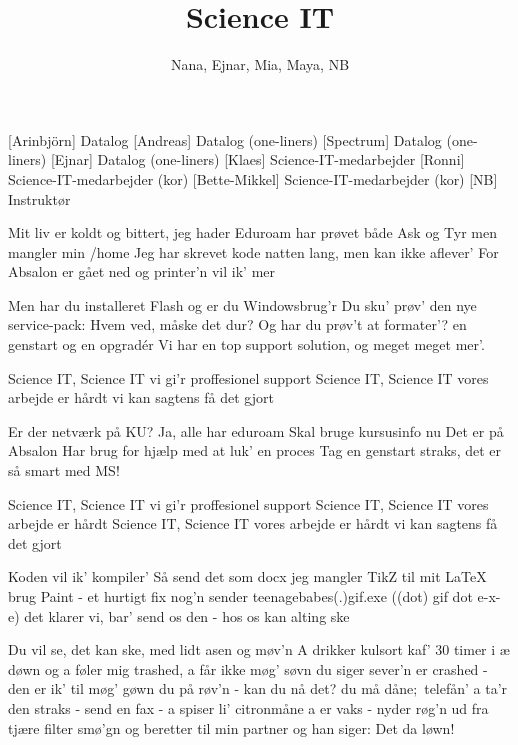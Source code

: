 \documentclass[a4paper,11pt]{article}
\title{Science IT}
\author{Nana, Ejnar, Mia, Maya, NB}
\begin{document}
\maketitle

\begin{roles}
[Arinbjörn] Datalog
[Andreas] Datalog (one-liners)
[Spectrum] Datalog (one-liners)
[Ejnar] Datalog (one-liners)
[Klaes] Science-IT-medarbejder
[Ronni] Science-IT-medarbejder (kor)
[Bette-Mikkel] Science-IT-medarbejder (kor)
[NB] Instruktør
\end{roles}

\begin{song}

 Mit liv er koldt og bittert, jeg hader Eduroam
 har prøvet både Ask og Tyr men mangler min /home
 Jeg har skrevet kode natten lang, men kan ikke aflever'
For Absalon er gået ned
 og printer'n vil ik' mer

 Men har du installeret Flash
og er du Windowsbrug'r
 Du sku' prøv' den nye service-pack:
Hvem ved, måske det dur?
 Og har du prøv't at formater'?
en genstart og en opgradér
 Vi har en top support solution,
og meget meget mer'.

 Science IT, Science IT
 vi gi'r proffesionel support
 Science IT, Science IT
vores arbejde er hårdt
vi kan sagtens få det gjort

 Er der netværk på KU?
 Ja, alle har eduroam
 Skal bruge kursusinfo nu
 Det er på Absalon
 Har brug for hjælp med at luk' en proces
 Tag en genstart straks, det er så smart med MS!

 Science IT, Science IT
 vi gi'r proffesionel support
 Science IT, Science IT
vores arbejde er hårdt
Science IT, Science IT
vores arbejde er hårdt
vi kan sagtens få det gjort

 Koden vil ik' kompiler'
 Så send det som docx
 jeg mangler TikZ til mit LaTeX
 brug Paint - et hurtigt fix
 nog'n sender teenagebabes(.)gif.exe ((dot) gif dot e-x-e)
 det klarer vi, bar' send os den - hos os kan alting ske


 Du vil se, det kan ske, med lidt asen og møv'n
A drikker kulsort kaf' 30 timer i æ døwn
og a føler mig trashed, a får ikke møg' søvn
du siger sever'n er crashed - den er ik' til møg' gøwn
 du på røv'n - kan du nå det? du må dåne$;$ telefån'
a ta'r den straks - send en fax - a spiser li' citronmåne
a er vaks - nyder røg'n ud fra tjære filter smø'gn
og beretter til min partner og han siger:
 Det da løwn!


\end{song}
\end{document}
